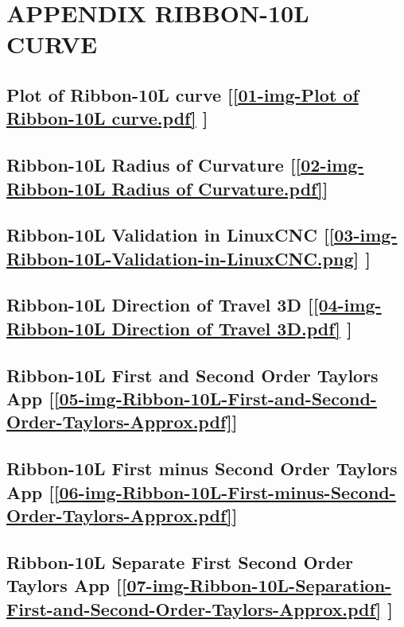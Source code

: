 \section{\textbf{APPENDIX RIBBON-10L CURVE}} \label{APPENDIX RIBBON-10L CURVE}


\subsection       {Plot of Ribbon-10L curve
	[\ref  {01-img-Plot of Ribbon-10L curve.pdf} ] }
\label{ssec-01-img-Plot of Ribbon-10L curve.pdf}

\subsection       {Ribbon-10L Radius of Curvature
	[\ref      {02-img-Ribbon-10L Radius of Curvature.pdf}] }
\label{ssec-02-img-Ribbon-10L Radius of Curvature.pdf}

\subsection       {Ribbon-10L Validation in LinuxCNC
	[\ref      {03-img-Ribbon-10L-Validation-in-LinuxCNC.png} ] }
\label{ssec-03-img-Ribbon-10L-Validation-in-LinuxCNC.png}

\subsection     {Ribbon-10L Direction of Travel 3D
	[\ref      {04-img-Ribbon-10L Direction of Travel 3D.pdf} ] }
\label{ssec-04-img-Ribbon-10L Direction of Travel 3D.pdf}

\subsection       {Ribbon-10L First and Second Order Taylors App
	[\ref      {05-img-Ribbon-10L-First-and-Second-Order-Taylors-Approx.pdf}] }
\label{ssec-05-img-Ribbon-10L-First-and-Second-Order-Taylors-Approx.pdf}

\subsection       {Ribbon-10L First minus Second Order Taylors App
	[\ref      {06-img-Ribbon-10L-First-minus-Second-Order-Taylors-Approx.pdf}] }
\label{ssec-06-img-Ribbon-10L-First-minus-Second-Order-Taylors-Approx.pdf}

\subsection       {Ribbon-10L Separate First Second Order Taylors App
	[\ref      {07-img-Ribbon-10L-Separation-First-and-Second-Order-Taylors-Approx.pdf} ] }
\label{ssec-07-img-Ribbon-10L-Separation-First-and-Second-Order-Taylors-Approx.pdf}

